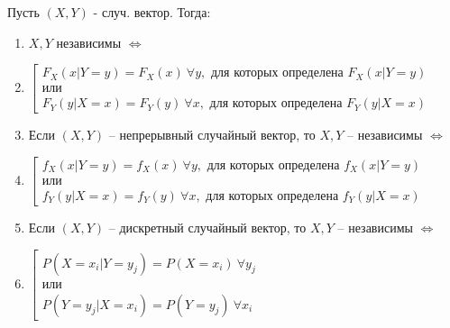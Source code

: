 Пусть $(X,Y)$ - случ. вектор. Тогда:
\begin{enumerate}[topsep=0pt, leftmargin=20pt, noitemsep, label=\arabic*\degree]
	\item $X,Y$ независимы $\Leftrightarrow$
	\item [] $
		\left[ 
		\begin{array}{l}
	  	 	F_X(x|Y=y)=F_X(x)~\forall y, \text{ для которых определена } F_X(x|Y=y)\\
	 		\text{или} \\
	  	 	F_Y(y|X=x)=F_Y(y)~\forall x, \text{ для которых определена } F_Y(y|X=x)
		\end{array}
	 	\right.
	 	$
	
	\item Если $(X,Y)$ -- непрерывный случайный вектор, то $X,Y$ -- независимы $\Leftrightarrow$
	\item [] $
	\left[ 
	\begin{array}{l}
		f_X(x|Y=y)=f_X(x)~\forall y, \text{ для которых определена } f_X(x|Y=y)\\
		\text{или} \\
		f_Y(y|X=x)=f_Y(y)~\forall x, \text{ для которых определена } f_Y(y|X=x)
	\end{array}
	\right.
	$
	
	\item Если $(X,Y)$ -- дискретный случайный вектор, то $X,Y$ -- независимы $\Leftrightarrow$
	\item [] $
	\left[ 
	\begin{array}{l}
		P(X=x_i|Y=y_j)=P(X=x_i)~\forall y_j\\
		\text{или} \\
		P(Y=y_j|X=x_i)=P(Y=y_j)~\forall x_i
	\end{array}
	\right.
	$

\end{enumerate}

\clearpage
